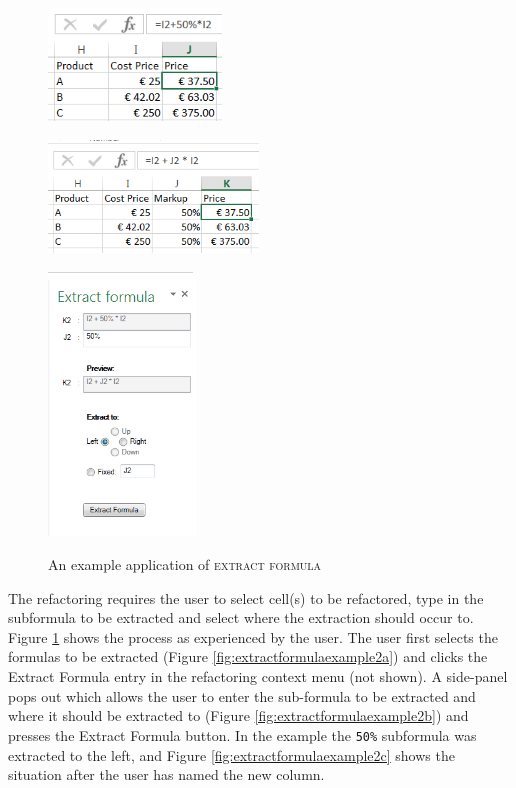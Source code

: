 \documentclass[12pt,a4paper,onecolumn,oneside,parskip]{memoir}
\newcommand{\f}[1]{\texttt{#1}}
\newcommand{\rf}[1]{\textsc{\lowercase{#1}}}
\begin{document}
\begin{figure}
\begin{minipage}[c][8cm][c]{0.5\textwidth}
\centering
\vspace*{\fill}
\includegraphics[height=3cm]{implementation/extractformula/21}
\label{fig:extractformulaexample2a}

\includegraphics[height=3cm]{implementation/extractformula/23}
\addtocounter{subfigure}{1}
\label{fig:extractformulaexample2c}
\end{minipage}
\begin{minipage}[c][8cm][t]{0.5\textwidth}
\vspace*{\fill}
\centering
\includegraphics[height=7cm]{implementation/extractformula/22}
\addtocounter{subfigure}{-2}
\label{fig:extractformulaexample2b}
\end{minipage}
\caption{An example application of \rf{Extract Formula}}
\label{fig:extractformulaexample2}
\end{figure}

The refactoring requires the user to select cell(s) to be refactored, type in the subformula to be extracted and select where the extraction should occur to.
Figure \ref{fig:extractformulaexample2} shows the process as experienced by the user.
The user first selects the formulas to be extracted (Figure \ref{fig:extractformulaexample2a}) and clicks the Extract Formula entry in the refactoring context menu (not shown).
A side-panel pops out which allows the user to enter the sub-formula to be extracted and where it should be extracted to (Figure \ref{fig:extractformulaexample2b}) and presses the Extract Formula button.
In the example the \f{50\%} subformula was extracted to the left, and Figure \ref{fig:extractformulaexample2c} shows the situation after the user has named the new column.
\end{document}

